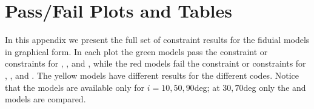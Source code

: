 \section{Pass/Fail Plots and Tables}\label{app:tables}


In this appendix we present the full set of constraint results for the fiduial models in graphical form.  In each plot the green models pass the constraint or constraints for \kharma, \bhac, and \hamr, while the red models fail the constraint or constraints for \kharma, \bhac, and \hamr.  The yellow models have different results for the different codes.  Notice that the \hamr models are available only for $i = 10, 50, 90$deg; at $30, 70$deg only the \kharma and \bhac models are compared.  




